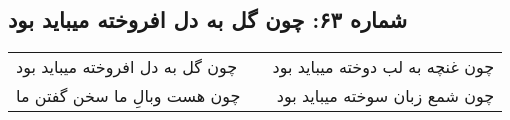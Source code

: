 \begin{center}
\section*{شماره ۶۳: چون گل به دل افروخته میباید بود}
\label{sec:063}
\begin{longtable}{l p{0.5cm} r}
چون گل به دل افروخته میباید بود
&&
چون غنچه به لب دوخته میباید بود
\\
چون هست وبالِ ما سخن گفتن ما
&&
چون شمع زبان سوخته میباید بود
\\
\end{longtable}
\end{center}
